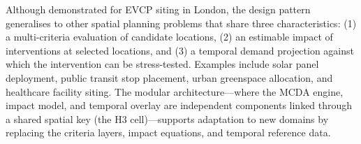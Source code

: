 Although demonstrated for EVCP siting in London, the design pattern generalises to other spatial planning problems that share three characteristics: (1) a multi-criteria evaluation of candidate locations, (2) an estimable impact of interventions at selected locations, and (3) a temporal demand projection against which the intervention can be stress-tested. Examples include solar panel deployment, public transit stop placement, urban greenspace allocation, and healthcare facility siting. The modular architecture---where the MCDA engine, impact model, and temporal overlay are independent components linked through a shared spatial key (the H3 cell)---supports adaptation to new domains by replacing the criteria layers, impact equations, and temporal reference data.
